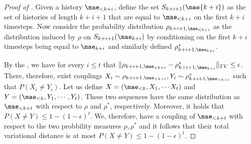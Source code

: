\begin{proof}[Proof of ]
Given a history $\mae_{<k+i}$, define the set $S_{k+i+1}(\mae{k+i})$ as the set of histories of length $k+i+1$ that are equal to $\mae_{<k+i}$ on the first $k+i$ timesteps. Now consider the probability distribution $\rho_{k+i+1, \mae_{<k+i}}$ as the distribution induced by $\rho$ on $S_{k+i+1}(\mae_{k+i})$ by conditioning on the first $k+i$ timesteps being equal to $\mae_{k+i}$ and similarly defined $\rho^*_{k+i+1, \mae_{k+i}}$.

By the , we have for every $i \leq t$ that $\|\rho_{k+i+1, \mae_{<k+i}} - \rho^*_{k+i+1, \mae_{k+i}}\|_{TV} \leq \epsilon$. There, therefore, exist couplings $X_i \sim \rho_{k+i+1, \mae_{<k+i}}, Y_i \sim \rho^*_{k+i+1, \mae_{<k+i}}$ such that $P(X_i \neq Y_i)$. Let us define $X = (\mae_{<k}, X_1, \cdots X_t)$ and $Y = (\mae_{<k}, Y_1, \cdots, Y_t)$. These two sequences have the same distribution as $\mae_{<k+t}$ with respect to $\rho$ and $\rho^*$, respectively. Moreover, it holds that $P(X \neq Y) \leq 1- (1- \epsilon)^t$. We, therefore, have a coupling of $\mae_{<k+t}$ with respect to the two probbility measures $\rho, \rho^*$ and it follows that their total variational distance is at most $P(X \neq Y) \leq 1- (1- \epsilon)^t$.


\end{proof}

